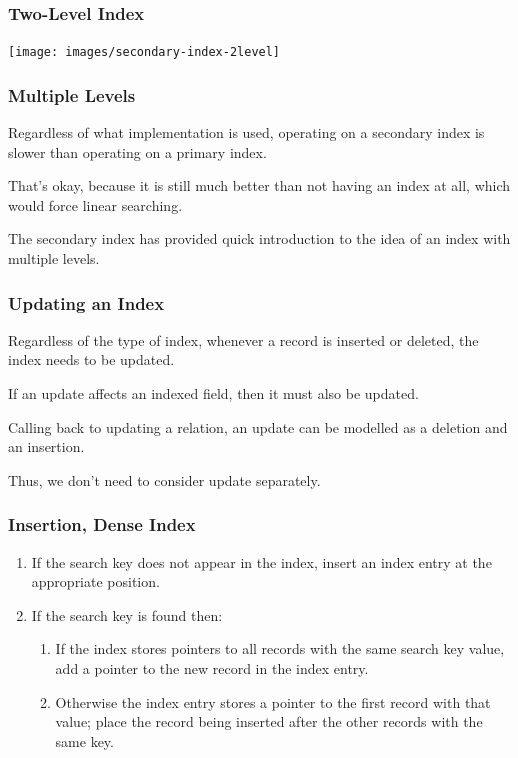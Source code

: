\begin{frame}
\frametitle{Two-Level Index}

\begin{center}
\texttt{[image: images/secondary-index-2level]}
\end{center}


\end{frame}



\begin{frame}
\frametitle{Multiple Levels}

Regardless of what implementation is used, operating on a secondary index is slower than operating on a primary index. 

That's okay, because it is still much better than not having an index at all, which would force linear searching. 

The secondary index has provided quick introduction to the idea of an index with multiple levels.

\end{frame}


\begin{frame}
\frametitle{Updating an Index}

Regardless of the type of index, whenever a record is inserted or deleted, the index needs to be updated. 

If an update affects an indexed field, then it must also be updated. 

Calling back to updating a relation, an update can be modelled as a deletion and an insertion.

Thus, we don't need to consider update separately.

\end{frame}


\begin{frame}
\frametitle{Insertion, Dense Index}

\begin{enumerate}
	\item If the search key does not appear in the index, insert an index entry at the appropriate position.
	\item If the search key is found then:
		\begin{enumerate}
			\item If the index stores pointers to all records with the same search key value, add a pointer to the new record in the index entry.
			\item Otherwise the index entry stores a pointer to the first record with that value; place the record being inserted after the other records with the same key.
		\end{enumerate}
\end{enumerate}


\end{frame}


